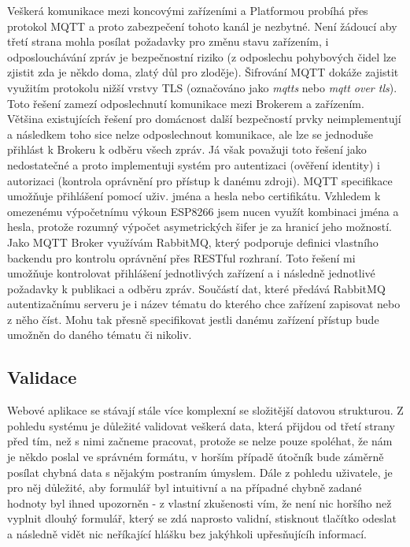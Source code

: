 Veškerá komunikace mezi koncovými zařízeními a Platformou probíhá přes protokol MQTT a proto zabezpečení tohoto kanál je nezbytné. Není žádoucí aby třetí strana mohla posílat požadavky pro změnu stavu zařízením, i odposlouchávání zpráv je bezpečnostní riziko (z odposlechu pohybových čidel lze zjistit zda je někdo doma, zlatý důl pro zloděje). Šifrování MQTT dokáže zajistit využitím protokolu nižší vrstvy TLS (označováno jako \textit{mqtts} nebo \textit{mqtt over tls}). Toto řešení zamezí odposlechnutí komunikace mezi Brokerem a zařízením. Většina existujících řešení pro domácnost další bezpečností prvky neimplementují a následkem toho sice nelze odposlechnout komunikace, ale lze se jednoduše přihlást k Brokeru k odběru všech zpráv. Já však považuji toto řešení jako nedostatečné a proto implementuji systém pro autentizaci (ověření identity) i autorizaci (kontrola oprávnění pro přístup k danému zdroji). MQTT specifikace umožňuje přihlášení pomocí uživ. jména a hesla nebo certifikátu. Vzhledem k omezenému výpočetnímu výkoun ESP8266 jsem nucen využít kombinaci jména a hesla, protože rozumný výpočet asymetrických šifer je za hranicí jeho možností. Jako MQTT Broker využívám RabbitMQ, který podporuje definici vlastního backendu pro kontrolu oprávnění přes RESTful rozhraní. Toto řešení mi umožňuje kontrolovat přihlášení jednotlivých zařízení a i následně jednotlivé požadavky k publikaci a odběru zpráv. Součástí dat, které předává RabbitMQ autentizačnímu serveru je i název tématu do kterého chce zařízení zapisovat nebo z něho číst. Mohu tak přesně specifikovat jestli danému zařízení přístup bude umožněn do daného tématu či nikoliv.

\subsection{Validace}
\label{BE:Validace}
Webové aplikace se stávají stále více komplexní se složitější datovou strukturou. Z pohledu systému je důležité validovat veškerá data, která přijdou od třetí strany před tím, než s nimi začneme pracovat, protože se nelze pouze spoléhat, že nám je někdo poslal ve správném formátu, v horším případě útočník bude záměrně posílat chybná data s nějakým postraním úmyslem. Dále z pohledu uživatele, je pro něj důležité, aby formulář byl intuitivní a na případné chybně zadané hodnoty byl ihned upozorněn - z vlastní zkušenosti vím, že není nic horšího než vyplnit dlouhý formulář, který se zdá naprosto validní, stisknout tlačítko odeslat a následně vidět nic neříkající hlášku  bez jakýhkoli upřesňujícíh informací.

